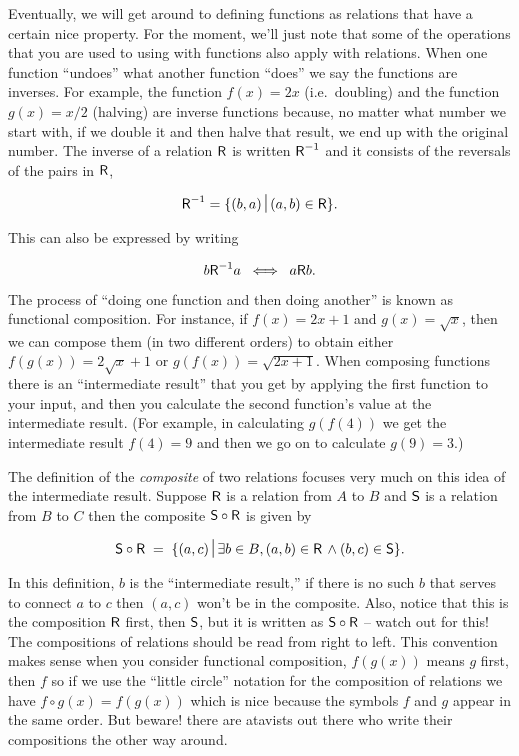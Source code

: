 Eventually, we will get around to defining functions as relations that
have a certain nice property.  For the moment, we'll just note that
some of the operations that you are used to using with functions
also apply with relations.  When one function ``undoes'' what another
function ``does'' we say the functions are inverses.  For example,
the function $f(x)=2x$ (i.e.\ doubling) and the function $g(x)=x/2$ (halving)
are inverse functions because, no matter what number we start with, if we
double it and then halve that result, we end up with the original number.
The inverse of a relation $\mbox{\textsf R}$ is written $\mbox{\textsf R}^{-1}$ and it consists of
the reversals of the pairs in $\mbox{\textsf R}$,

\[ \relR^{-1} = \{ (b,a) \suchthat (a,b) \in \relR \}. \]

This can also be expressed by writing

\[ b\mbox{\textsf R}^{-1}a \; \iff \; a\mbox{\textsf R} b. \]

The process of ``doing one function and then doing another'' is known
as functional composition.  For instance,
if $f(x) = 2x+1$ and $g(x) = \sqrt{x}$, then we can compose them (in two
different orders) to obtain either $f(g(x)) = 2\sqrt{x}+1$ or 
$g(f(x)) = \sqrt{2x+1}$.  When composing functions there is an ``intermediate
result'' that you get by applying the first function to your input, and then
you calculate the second function's value at the intermediate result.  
(For example, in calculating $g(f(4))$ we get the intermediate result
$f(4) = 9$ and then we go on to calculate $g(9) = 3$.)

The definition of the \emph{composite}
of two relations focuses very much on this idea
of the intermediate result.  Suppose $\mbox{\textsf R}$ is a relation from
$A$ to $B$ and $\mbox{\textsf S}$ is a relation from $B$ to $C$ then the composite
$\mbox{\textsf S} \circ \mbox{\textsf R}$ is given by

\[  \relS \circ \relR \; = \; \{ (a,c) \suchthat \exists b \in B, (a,b) \in \relR \, \land (b,c) \in \relS \}. \]

In this definition, $b$ is the ``intermediate result,'' if there is no such
$b$ that serves to connect $a$ to $c$ then $(a,c)$ won't be in the composite.
Also, notice that this is the composition $\mbox{\textsf R}$ first, then $\mbox{\textsf S}$, but
it is written as $\mbox{\textsf S} \circ \mbox{\textsf R}$  -- watch out for this!  The 
compositions of relations should be read from right to left.  This convention
makes sense when you consider functional composition, $f(g(x))$ means $g$ 
first, then $f$ so if we use the ``little circle'' notation for the
composition of relations we have $f \circ g (x) = f(g(x))$ which is nice
because the symbols $f$ and $g$ appear in the same order.  But beware! there
are atavists out there who write their compositions the other way around.

